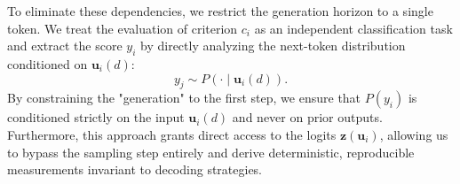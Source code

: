 To eliminate these dependencies, we restrict the generation horizon to a single token. We treat the evaluation of criterion $c_i$ as an independent classification task and extract the score $y_i$ by directly analyzing the next-token distribution conditioned on $\mathbf{u}_i(d)$:
\begin{equation}
    y_j \sim P(\cdot \mid \mathbf{u}_i(d)).
\end{equation}
By constraining the "generation" to the first step, we ensure that $P(y_i)$ is conditioned strictly on the input $\mathbf{u}_i(d)$ and never on prior outputs. Furthermore, this approach grants direct access to the logits $\mathbf{z}(\mathbf{u}_i)$, allowing us to bypass the sampling step entirely and derive deterministic, reproducible measurements invariant to decoding strategies.







